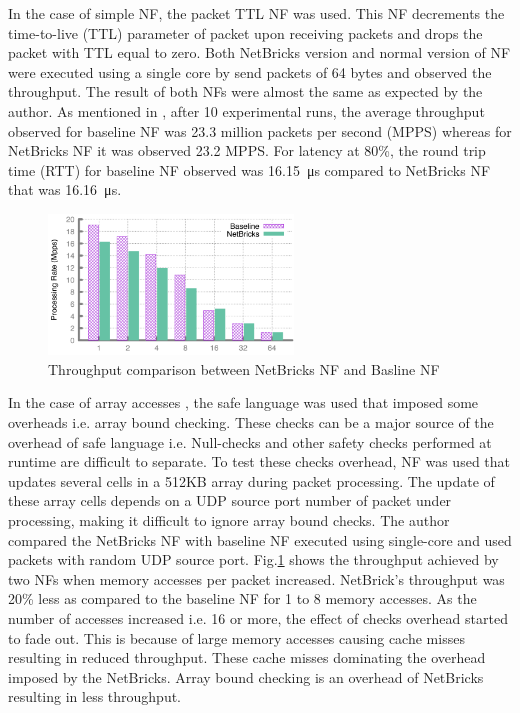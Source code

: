 \documentclass[10pt, a4paper, conference]{IEEEtran}
\begin{document}
In the case of simple NF, the packet TTL NF was used. This NF decrements the time-to-live (TTL) parameter of packet upon receiving packets and drops the packet with TTL equal to zero. Both NetBricks version and normal version of NF were executed using a single core by send packets of 64 bytes and observed the throughput. The result of both NFs were almost the same as expected by the author. As mentioned in \cite{Panda2016}, after 10 experimental runs, the average throughput observed for baseline NF was 23.3 million packets per second (MPPS) whereas for NetBricks NF it was observed 23.2 MPPS. For latency at 80\%, the round trip time (RTT) for baseline NF observed was \SI{16.15}{\micro\second} compared to NetBricks NF that was \SI{16.16}{\micro\second}.

\begin{figure}
	\centering
	\includegraphics[width=65mm]{figures/fig5}
	\caption{Throughput comparison between NetBricks NF and Basline NF\cite{Panda2016}}
	
	\label{key5}
\end{figure}

In the case of array accesses \cite{Panda2016}, the safe language was used that imposed some overheads i.e. array bound checking. These checks can be a major source of the overhead of safe language i.e. Null-checks and other safety checks performed at runtime are difficult to separate. To test these checks overhead, NF was used that updates several cells in a 512KB array during packet processing\cite{Panda2016}. The update of these array cells depends on a UDP source port number of packet under processing, making it difficult to ignore array bound checks. The author compared the NetBricks NF with baseline NF executed using single-core and used packets with random UDP source port\cite{Panda2016}. Fig.\ref{key5} shows the throughput achieved by two NFs when memory accesses per packet increased. NetBrick’s throughput was 20\% less as compared to the baseline NF for 1 to 8 memory accesses. As the number of accesses increased i.e. 16 or more, the effect of checks overhead started to fade out\cite{Panda2016}. This is because of large memory accesses causing cache misses resulting in reduced throughput. These cache misses dominating the overhead imposed by the NetBricks. Array bound checking is an overhead of NetBricks resulting in less throughput.    
\end{document}
